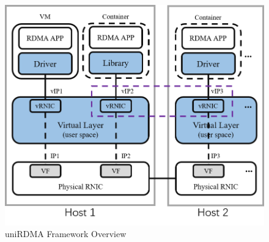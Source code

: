 \begin{figure}[!ht]
	\centering
	\includegraphics[width=0.9\linewidth]{images/framework-overview.png}
	\caption{uniRDMA Framework Overview}
	\label{fig:framework-overview}
\end{figure}
